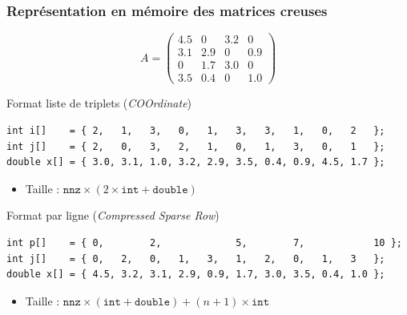 \documentclass[xcolor={x11names,svgnames}]{beamer}
\begin{document}
\begin{frame}[fragile]
  \frametitle{Représentation en mémoire des matrices creuses}

  \[
    A = \begin{pmatrix}
      4.5 & 0 & 3.2 & 0 \\
      3.1 & 2.9 & 0 & 0.9 \\
      0 & 1.7 & 3.0 & 0 \\
      3.5 & 0.4 & 0 & 1.0
    \end{pmatrix}
  \]
  
  \begin{alertblock}{Format \og liste de triplets\fg{} (\emph{COOrdinate})}
\vspace{-2mm}
{\scriptsize
\begin{verbatim}
int i[]    = { 2,   1,   3,   0,   1,   3,   3,   1,   0,   2   };
int j[]    = { 2,   0,   3,   2,   1,   0,   1,   3,   0,   1   };
double x[] = { 3.0, 3.1, 1.0, 3.2, 2.9, 3.5, 0.4, 0.9, 4.5, 1.7 };
\end{verbatim}
}
\vspace{-4mm}
\begin{itemize}
    \item Taille : $\texttt{nnz} \times (2 \times \texttt{int} + \texttt{double})$
    \end{itemize}
  \end{alertblock}

  \begin{exampleblock}{Format \og par ligne\fg{} (\emph{Compressed Sparse Row})}
\vspace{-2mm}
{\scriptsize
\begin{verbatim}
int p[]    = { 0,        2,             5,        7,            10 };
int j[]    = { 0,   2,   0,   1,   3,   1,   2,   0,   1,   3   };
double x[] = { 4.5, 3.2, 3.1, 2.9, 0.9, 1.7, 3.0, 3.5, 0.4, 1.0 };
\end{verbatim}
}
\vspace{-4mm}
\begin{itemize}
    \item Taille : $\texttt{nnz} \times (\texttt{int} + \texttt{double}) + (n + 1) \times \texttt{int}$
    \end{itemize}
  \end{exampleblock}
\end{frame}

\end{document}
